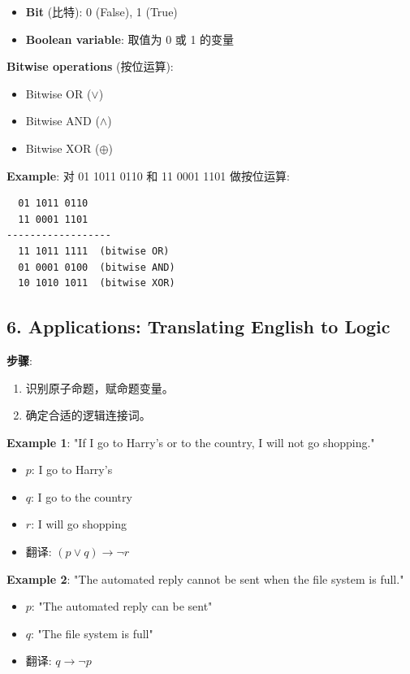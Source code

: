 \documentclass[10pt,a4paper,openany]{ctexbook}
\theoremstyle{definition}
\theoremstyle{remark}
\begin{document}
\begin{itemize}
\item \textbf{Bit} (比特): 0 (False), 1 (True)
\item \textbf{Boolean variable}: 取值为 0 或 1 的变量

\end{itemize}

\textbf{Bitwise operations} (按位运算):
\begin{itemize}
\item Bitwise OR ($\lor$)
\item Bitwise AND ($\land$)
\item Bitwise XOR ($\oplus$)

\end{itemize}

\textbf{Example}: 对 01 1011 0110 和 11 0001 1101 做按位运算:
{\footnotesize\begin{verbatim}
  01 1011 0110
  11 0001 1101
------------------
  11 1011 1111  (bitwise OR)
  01 0001 0100  (bitwise AND)
  10 1010 1011  (bitwise XOR)
\end{verbatim}}

\vspace{-2pt}

\subsection{6. Applications: Translating English to Logic}

\textbf{步骤}:
\begin{enumerate}
\item 识别原子命题，赋命题变量。
\item 确定合适的逻辑连接词。

\end{enumerate}

\textbf{Example 1}: "If I go to Harry's or to the country, I will not go shopping."
\begin{itemize}
\item $p$: I go to Harry's
\item $q$: I go to the country
\item $r$: I will go shopping
\item 翻译: $(p \lor q) \to \neg r$

\end{itemize}

\textbf{Example 2}: "The automated reply cannot be sent when the file system is full."
\begin{itemize}
\item $p$: "The automated reply can be sent"
\item $q$: "The file system is full"
\item 翻译: $q \to \neg p$

\end{itemize}
\end{document}
